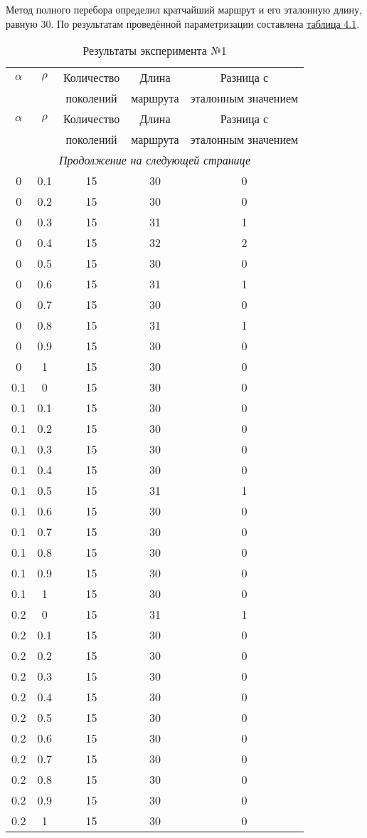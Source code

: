 Метод полного перебора определил кратчайший маршрут и его эталонную длину, равную 30. По результатам проведённой параметризации составлена \hyperref[table_1]{таблица 4.1}.


\begin{longtable}{|c|c|c|c|c|}
	\caption{Результаты эксперимента №1}\label{table_1}\\
	\hline
	
	$\alpha$ & $\rho$ & Количество  & Длина & Разница с  \\
	&& поколений & маршрута & эталонным значением\\
	\hline
	\endfirsthead
	
	\hline
	$\alpha$ & $\rho$ & Количество  & Длина & Разница с  \\
	&& поколений & маршрута & эталонным значением\\
	\hline
	\endhead
	
	\hline
	\multicolumn{5}{c}{\textit{Продолжение на следующей странице}}
	\endfoot
	\hline
	\endlastfoot
	
	0& 0& 15& 31& 1 \\
	0& 0.1& 15& 30& 0 \\
	0& 0.2& 15& 30& 0 \\
	0& 0.3& 15& 31& 1 \\
	0& 0.4& 15& 32& 2 \\
	0& 0.5& 15& 30& 0 \\
	0& 0.6& 15& 31& 1 \\
	0& 0.7& 15& 30& 0 \\
	0& 0.8& 15& 31& 1 \\
	0& 0.9& 15& 30& 0 \\
	0& 1& 15& 30& 0 \\
	\hline
	
	0.1& 0& 15& 30& 0 \\
	0.1& 0.1& 15& 30& 0 \\
	0.1& 0.2& 15& 30& 0 \\
	0.1& 0.3& 15& 30& 0 \\
	0.1& 0.4& 15& 30& 0 \\
	0.1& 0.5& 15& 31& 1 \\
	0.1& 0.6& 15& 30& 0 \\
	0.1& 0.7& 15& 30& 0 \\
	0.1& 0.8& 15& 30& 0 \\
	0.1& 0.9& 15& 30& 0 \\
	0.1& 1& 15& 30& 0 \\
	\hline
	
	0.2& 0& 15& 31& 1 \\
	0.2& 0.1& 15& 30& 0 \\
	0.2& 0.2& 15& 30& 0 \\
	0.2& 0.3& 15& 30& 0 \\
	0.2& 0.4& 15& 30& 0 \\
	0.2& 0.5& 15& 30& 0 \\
	0.2& 0.6& 15& 30& 0 \\
	0.2& 0.7& 15& 30& 0 \\
	0.2& 0.8& 15& 30& 0 \\
	0.2& 0.9& 15& 30& 0 \\
	0.2& 1& 15& 30& 0 \\
	\hline
	

\end{longtable}
